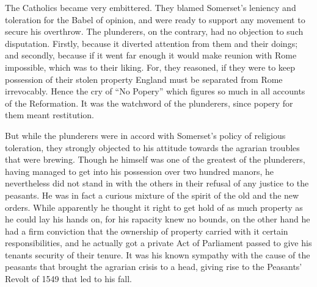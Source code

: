 \documentclass{book}
\begin{document}
The Catholics became very embittered. They blamed Somerset’s leniency and toleration for the Babel of opinion, and were ready to support any movement to secure his overthrow. The plunderers, on the contrary, had no objection to such disputation. Firstly, because it diverted attention from them and their doings; and secondly, because if it went far enough it would make reunion with Rome impossible, which was to their liking. For, they reasoned, if they were to keep possession of their stolen property England must be separated from Rome irrevocably. Hence the cry of “No Popery” which figures so much in all accounts of the Reformation. It was the watchword of the plunderers, since popery for them meant restitution.

But while the plunderers were in accord with Somerset’s policy of religious toleration, they strongly objected to his attitude towards the agrarian troubles that were brewing. Though he himself was one of the greatest of the plunderers, having managed to get into his possession over two hundred manors, he nevertheless did not stand in with the others in their refusal of any justice to the peasants. He was in fact a curious mixture of the spirit of the old and the new orders. While apparently he thought it right to get hold of as much property as he could lay his hands on, for his rapacity knew no bounds, on the other hand he had a firm conviction that the ownership of property carried with it certain responsibilities, and he actually got a private Act of Parliament passed to give his tenants security of their tenure. It was his known sympathy with the cause of the peasants that brought the agrarian crisis to a head, giving rise to the Peasants’ Revolt of 1549 that led to his fall.
\end{document}
